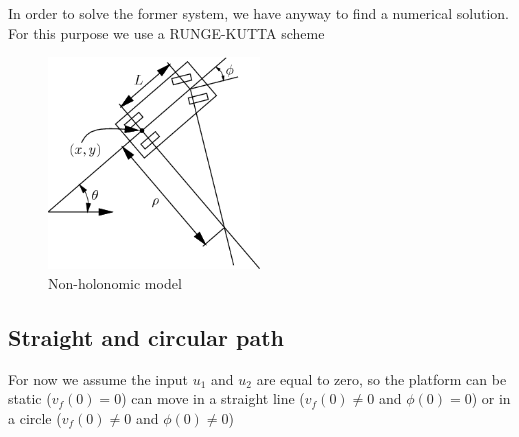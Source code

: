 In order to solve the former system, we have anyway to find a numerical solution. For this purpose we use a    
RUNGE-KUTTA scheme %
\begin{figure}[!ht]
    \centering
    \includegraphics[width=0.5\textwidth]{img/non_holonomic_model.png}
    \caption{Non-holonomic model}
    \label{fig:nonholonomicmodel}
\end{figure}
\subsection{Straight and circular path}
For now we assume the input $u_1$ and $u_2$  are equal to zero, so the platform can be static ($v_f(0) = 0$) can move in a straight line ($v_f(0) \neq 0$ and $\phi(0) = 0$) or in a circle ($v_f(0) \neq 0$ and $\phi(0) \neq 0$)

